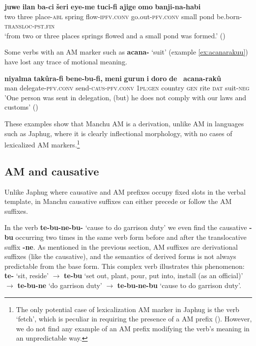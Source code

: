 \documentclass{article}
\newcommand{\ipa}[1]{\textbf{{\phon\mbox{#1}}}} %
\begin{document}
\begin{exe}
\ex 
\gll
\ipa{juwe} 	\ipa{ilan} 	\ipa{ba-ci} 	\ipa{šeri} 	\ipa{eye-me} 	\ipa{tuci-fi} 	\ipa{ajige} 	\ipa{omo} 	\ipa{banji-na-habi} \\
two three place-\textsc{abl} spring flow-\textsc{ipfv.conv} go.out-\textsc{pfv.conv} small pond be.born-\textsc{transloc-pst.fin} \\
‘from two or three places springs flowed and a small pond was formed.’ (\citealt[68;14b]{shunjuu64tulishen})
\end{exe}

Some verbs with an AM marker such as \ipa{acana-} `suit' (example \ref{ex:acanarakuu}) have lost any trace of motional meaning.

\begin{exe}
\ex \label{ex:acanarakuu}
\gll
\ipa{niyalma} 	\ipa{takûra-fi} 	\ipa{bene-bu-fi,} 	\ipa{meni} 	\ipa{gurun} 	\ipa{i} 	\ipa{doro} 	\ipa{de } 	\ipa{acana-rakû} \\
man delegate-\textsc{pfv.conv} send-\textsc{caus}-\textsc{pfv.conv} \textsc{1pl:gen} country \textsc{gen} rite \textsc{dat} suit-\textsc{neg} \\
\glt  'One person was sent in delegation, (but) he does not comply with our laws and customs' (\citealt[112-113;79b]{shunjuu64tulishen})
\end{exe} 


These examples show that Manchu AM is a derivation, unlike AM in languages such as Japhug, where it is clearly inflectional morphology, with no cases of lexicalized AM markers.\footnote{The only potential case of lexicalization AM marker in Japhug is the verb `fetch', which is peculiar in requiring the presence of a AM prefix (\citealt[210]{jacques13harmonization}). However, we do not find any example of an AM prefix modifying the verb's meaning in an unpredictable way.}



\subsection{AM and causative} \label{sec:manchu.caus}

Unlike Japhug where causative and AM prefixes occupy fixed slots in the verbal template, in Manchu causative suffixes can either precede or follow the AM suffixes. 

In the verb \ipa{te-bu-ne-bu-} `cause to do garrison duty' we even find the causative \ipa{-bu} occurring two times in the same verb form before and after the translocative suffix \ipa{-ne}. As mentioned in the previous section, AM suffixes are derivational suffixes (like the causative), and the semantics of derived forms is not always predictable from the base form. This complex verb illustrates this phenomenon: \ipa{te-} `sit, reside' $\rightarrow$ \ipa{te-bu} `set out, plant, pour, put into, install (as an official)' $\rightarrow$ \ipa{te-bu-ne} `do garrison duty'
$\rightarrow$ \ipa{te-bu-ne-bu} `cause to do garrison duty'.
\end{document}
